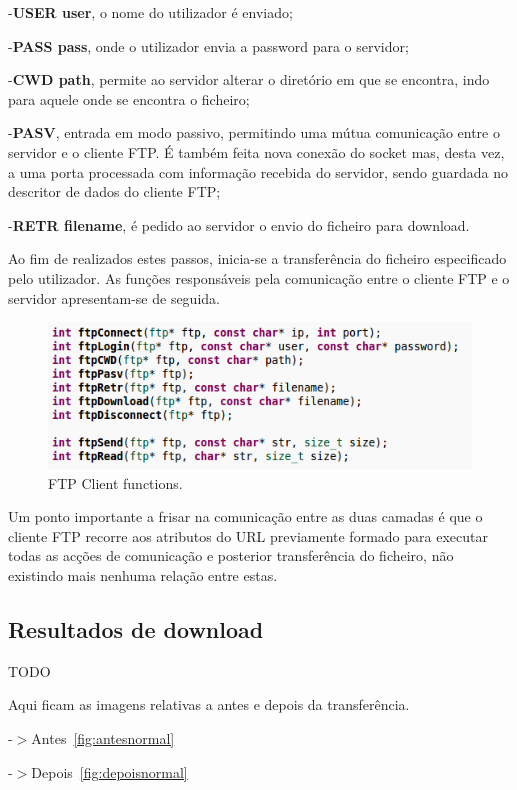 \documentclass[a4paper]{article}
\begin{document}
 -\textbf{USER user}, o nome do utilizador é enviado;
 
 -\textbf{PASS pass}, onde o utilizador envia a password para o servidor;
 
 -\textbf{CWD path}, permite ao servidor alterar o diretório em que se encontra, indo para aquele onde se encontra o ficheiro;
 
 -\textbf{PASV}, entrada em modo passivo, permitindo uma mútua comunicação entre o servidor e o cliente FTP. É também feita nova conexão do socket mas, desta vez, a uma porta processada com informação recebida do servidor, sendo guardada no descritor de dados do cliente FTP;
 
 -\textbf{RETR filename}, é pedido ao servidor o envio do ficheiro para download.
 
Ao fim de realizados estes passos, inicia-se a transferência do ficheiro especificado pelo utilizador. As funções responsáveis pela comunicação entre o cliente FTP e o servidor apresentam-se de seguida.

\begin{figure}[h!]
\centering
\includegraphics[scale=0.5]{res/ftp-functions.png}
\caption{FTP Client functions.}
\end{figure}

Um ponto importante a frisar na comunicação entre as duas camadas é que o cliente FTP recorre aos atributos do URL previamente formado para executar todas as acções de comunicação e posterior transferência do ficheiro, não existindo mais nenhuma relação entre estas.

\subsection{Resultados de download}
TODO

Aqui ficam as imagens relativas a antes e depois da transferência.

-$>$Antes~\autoref{fig:antesnormal}

-$>$Depois~\autoref{fig:depoisnormal}
\end{document}
